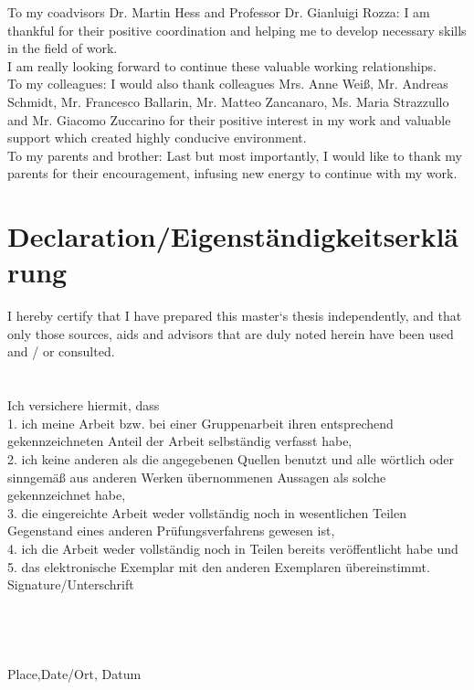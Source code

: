\documentclass[a4paper,openany]{book}
\begin{document}
To my coadvisors Dr. Martin Hess and Professor Dr. Gianluigi Rozza: I am thankful for their positive coordination and helping me to develop necessary skills in the field of work. \\

I am really looking forward to continue these valuable working relationships.\\

To my colleagues: I would also thank colleagues Mrs. Anne Weiß, Mr. Andreas Schmidt, Mr. Francesco Ballarin, Mr. Matteo Zancanaro, Ms. Maria Strazzullo and Mr. Giacomo Zuccarino for their positive interest in my work and valuable support which created highly conducive environment.\\

To my parents and brother: Last but most importantly, I would like to thank my parents for their encouragement, infusing new energy to continue with my work.

\newpage

\section{Declaration/Eigenst\"andigkeitserkl\"arung}

I hereby certify that I have prepared this master‘s thesis independently, and that only those sources, aids and advisors that are duly noted herein have been used and / or consulted.\\
${}$\\
${}$\\

Ich versichere hiermit, dass\\
1. ich meine Arbeit bzw. bei einer Gruppenarbeit ihren entsprechend gekennzeichneten Anteil der Arbeit selbständig verfasst habe,\\
2. ich keine anderen als die angegebenen Quellen benutzt und alle wörtlich oder
sinngemäß aus anderen Werken übernommenen Aussagen als solche gekennzeichnet habe,\\
3. die eingereichte Arbeit weder vollständig noch in wesentlichen Teilen
Gegenstand eines anderen Prüfungsverfahrens gewesen ist,\\
4. ich die Arbeit weder vollständig noch in Teilen bereits veröffentlicht habe und\\
5. das elektronische Exemplar mit den anderen Exemplaren übereinstimmt.\\

Signature/Unterschrift
${}$\\
${}$\\
${}$\\
${}$\\
${}$\\
Place,Date/Ort, Datum
\end{document}
